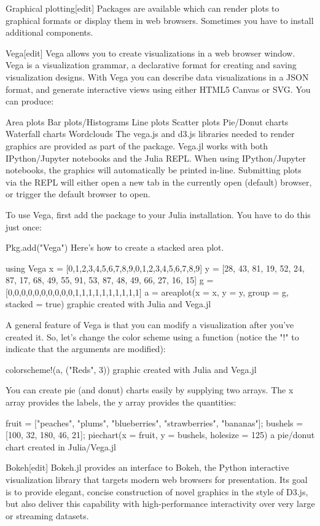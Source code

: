 Graphical plotting[edit]
Packages are available which can render plots to graphical formats or display them in web browsers. Sometimes you have to install additional components.

Vega[edit]
Vega allows you to create visualizations in a web browser window. Vega is a visualization grammar, a declarative format for creating and saving visualization designs. With Vega you can describe data visualizations in a JSON format, and generate interactive views using either HTML5 Canvas or SVG. You can produce:

Area plots
Bar plots/Histograms
Line plots
Scatter plots
Pie/Donut charts
Waterfall charts
Wordclouds
The vega.js and d3.js libraries needed to render graphics are provided as part of the package. Vega.jl works with both IPython/Jupyter notebooks and the Julia REPL. When using IPython/Jupyter notebooks, the graphics will automatically be printed in-line. Submitting plots via the REPL will either open a new tab in the currently open (default) browser, or trigger the default browser to open.

To use Vega, first add the package to your Julia installation. You have to do this just once:

Pkg.add("Vega")
Here's how to create a stacked area plot.

using Vega
x = [0,1,2,3,4,5,6,7,8,9,0,1,2,3,4,5,6,7,8,9]
y = [28, 43, 81, 19, 52, 24, 87, 17, 68, 49, 55, 91, 53, 87, 48, 49, 66, 27, 16, 15]
g = [0,0,0,0,0,0,0,0,0,0,1,1,1,1,1,1,1,1,1,1]
a = areaplot(x = x, y = y, group = g, stacked = true)
graphic created with Julia and Vega.jl

A general feature of Vega is that you can modify a visualization after you've created it. So, let's change the color scheme using a function (notice the "!" to indicate that the arguments are modified):

colorscheme!(a, ("Reds", 3))
graphic created with Julia and Vega.jl

You can create pie (and donut) charts easily by supplying two arrays. The x array provides the labels, the y array provides the quantities:

 fruit = ["peaches", "plums", "blueberries", "strawberries", "bananas"];
 bushels = [100, 32, 180, 46, 21];
 piechart(x = fruit, y = bushels, holesize = 125)
a pie/donut chart created in Julia/Vega.jl

Bokeh[edit]
Bokeh.jl provides an interface to Bokeh, the Python interactive visualization library that targets modern web browsers for presentation. Its goal is to provide elegant, concise construction of novel graphics in the style of D3.js, but also deliver this capability with high-performance interactivity over very large or streaming datasets.


